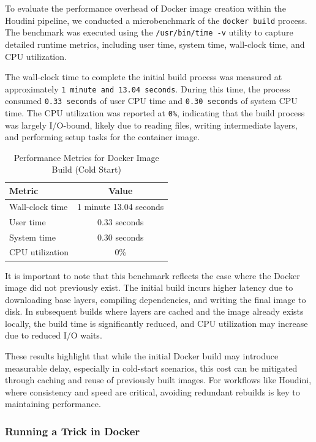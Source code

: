 \begin{doublespace}
To evaluate the performance overhead of Docker image creation within the Houdini pipeline, we conducted a microbenchmark of the \texttt{docker build} process. The benchmark was executed using the \texttt{/usr/bin/time -v} utility to capture detailed runtime metrics, including user time, system time, wall-clock time, and CPU utilization.

The wall-clock time to complete the initial build process was measured at approximately \texttt{1 minute and 13.04 seconds}. During this time, the process consumed \texttt{0.33 seconds} of user CPU time and \texttt{0.30 seconds} of system CPU time. The CPU utilization was reported at \texttt{0\%}, indicating that the build process was largely I/O-bound, likely due to reading files, writing intermediate layers, and performing setup tasks for the container image.

\begin{table}[h]
\centering
\caption{Performance Metrics for Docker Image Build (Cold Start)}
\label{tab:docker-build-performance}
\begin{tabular}{|l|c|}
\hline
\textbf{Metric}         & \textbf{Value} \\
\hline
Wall-clock time         & 1 minute 13.04 seconds \\
User time               & 0.33 seconds \\
System time             & 0.30 seconds \\
CPU utilization         & 0\% \\
\hline
\end{tabular}
\end{table}


It is important to note that this benchmark reflects the case where the Docker image did not previously exist. The initial build incurs higher latency due to downloading base layers, compiling dependencies, and writing the final image to disk. In subsequent builds where layers are cached and the image already exists locally, the build time is significantly reduced, and CPU utilization may increase due to reduced I/O waits.

These results highlight that while the initial Docker build may introduce measurable delay, especially in cold-start scenarios, this cost can be mitigated through caching and reuse of previously built images. For workflows like Houdini, where consistency and speed are critical, avoiding redundant rebuilds is key to maintaining performance.


\subsubsection{Running a Trick in Docker}


\end{doublespace}
